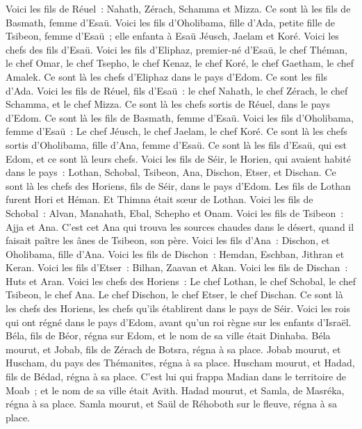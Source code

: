 \begin{multicols}{2}
Voici les fils de Réuel~: Nahath, Zérach, Schamma et Mizza. Ce sont là les fils de Basmath, femme d'Esaü.
Voici les fils d'Oholibama, fille d'Ada, petite fille de Tsibeon, femme d'Esaü~; elle enfanta à Esaü Jéusch, Jaelam et Koré.
Voici les chefs des fils d'Esaü. Voici les fils d'Eliphaz, premier-né d'Esaü, le chef Théman, le chef Omar, le chef Tsepho, le chef Kenaz,
le chef Koré, le chef Gaetham, le chef Amalek. Ce sont là les chefs d'Eliphaz dans le pays d'Edom. Ce sont les fils d'Ada.
Voici les fils de Réuel, fils d'Esaü~: le chef Nahath, le chef Zérach, le chef Schamma, et le chef Mizza. Ce sont là les chefs sortis de Réuel, dans le pays d'Edom. Ce sont là les fils de Basmath, femme d'Esaü.
Voici les fils d'Oholibama, femme d'Esaü~: Le chef Jéusch, le chef Jaelam, le chef Koré. Ce sont là les chefs sortis d'Oholibama, fille d'Ana, femme d'Esaü.
Ce sont là les fils d'Esaü, qui est Edom, et ce sont là leurs chefs.
Voici les fils de Séir, le Horien, qui avaient habité dans le pays~: Lothan, Schobal, Tsibeon, Ana,
Dischon, Etser, et Dischan. Ce sont là les chefs des Horiens, fils de Séir, dans le pays d'Edom.
Les fils de Lothan furent Hori et Héman. Et Thimna était sœur de Lothan.
Voici les fils de Schobal~: Alvan, Manahath, Ebal, Schepho et Onam.
Voici les fils de Tsibeon~: Ajja et Ana. C'est cet Ana qui trouva les sources chaudes dans le désert, quand il faisait paître les ânes de Tsibeon, son père.
Voici les fils d'Ana~: Dischon, et Oholibama, fille d'Ana.
Voici les fils de Dischon~: Hemdan, Eschban, Jithran et Keran.
Voici les fils d'Etser~: Bilhan, Zaavan et Akan.
Voici les fils de Dischan~: Huts et Aran.
Voici les chefs des Horiens~: Le chef Lothan, le chef Schobal, le chef Tsibeon, le chef Ana.
Le chef Dischon, le chef Etser, le chef Dischan. Ce sont là les chefs des Horiens, les chefs qu'ils établirent dans le pays de Séir.
Voici les rois qui ont régné dans le pays d'Edom, avant qu'un roi règne sur les enfants d'Israël.
Béla, fils de Béor, régna sur Edom, et le nom de sa ville était Dinhaba.
Béla mourut, et Jobab, fils de Zérach de Botsra, régna à sa place.
Jobab mourut, et Huscham, du pays des Thémanites, régna à sa place.
Huscham mourut, et Hadad, fils de Bédad, régna à sa place. C'est lui qui frappa Madian dans le territoire de Moab~; et le nom de sa ville était Avith.
Hadad mourut, et Samla, de Masréka, régna à sa place.
Samla mourut, et Saül de Réhoboth sur le fleuve, régna à sa place.

\end{multicols}
